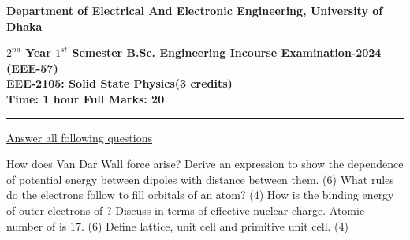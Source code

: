 \documentclass[a4paper,11pt]{exam}
\begin{document}
\newpage
\begin{center}
    \begin{large}
        {\textbf{
            Department of Electrical And Electronic Engineering, University of Dhaka \\
        }}
    \end{large}
    \textbf{$2^{nd}$ Year $1^{st}$ Semester B.Sc. Engineering Incourse Examination-2024 (EEE-57) \\
        EEE-2105: Solid State Physics(3 credits) \\
        Time: 1 hour \hfill Full Marks: 20}
    \noindent\rule{\linewidth}{1.2pt}
\end{center}
\underline{Answer all following questions} 
\begin{questions}
    \question How does Van Dar Wall force arise? Derive an expression to show the dependence of potential energy between dipoles with distance between them. \hfill (6)
    \question What rules do the electrons follow to fill orbitals of an atom? \hfill (4) 
    \question How is the binding energy of outer electrons of ? Discuss in terms of effective nuclear charge. Atomic number of  is 17. \hfill (6)
    \question Define lattice, unit cell and primitive unit cell. \hfill (4)
\end{questions}
\end{document}
